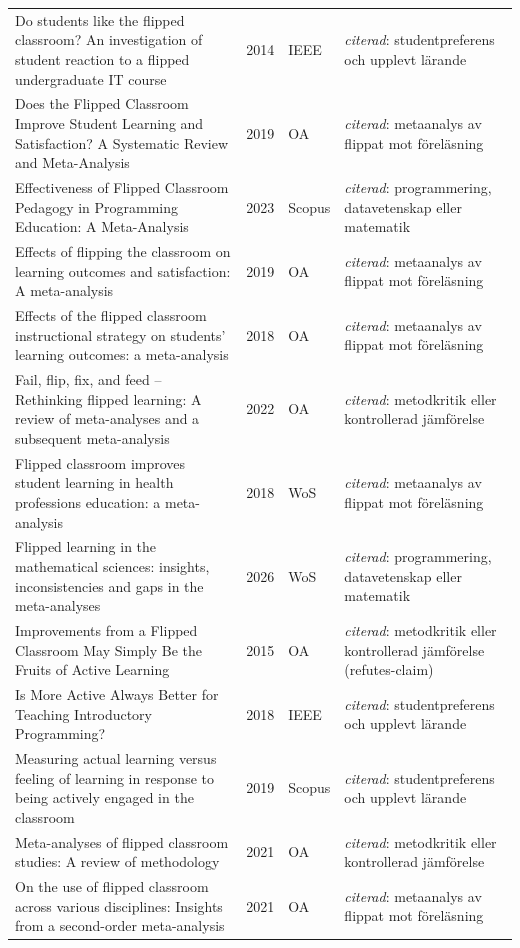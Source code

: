 \begin{longtable}{@{}%
  >{\raggedright\arraybackslash}p{}c%
  >{\raggedright\arraybackslash}p{}%
  >{\raggedright\arraybackslash}p{}@{}}
Do students like the flipped classroom? An investigation of student reaction to a flipped undergraduate IT course & 2014 & IEEE & \emph{citerad}: studentpreferens och upplevt lärande \\
Does the Flipped Classroom Improve Student Learning and Satisfaction? A Systematic Review and Meta-Analysis & 2019 & OA & \emph{citerad}: metaanalys av flippat mot föreläsning \\
Effectiveness of Flipped Classroom Pedagogy in Programming Education: A Meta-Analysis & 2023 & Scopus & \emph{citerad}: programmering, datavetenskap eller matematik \\
Effects of flipping the classroom on learning outcomes and satisfaction: A meta-analysis & 2019 & OA & \emph{citerad}: metaanalys av flippat mot föreläsning \\
Effects of the flipped classroom instructional strategy on students' learning outcomes: a meta-analysis & 2018 & OA & \emph{citerad}: metaanalys av flippat mot föreläsning \\
Fail, flip, fix, and feed -- Rethinking flipped learning: A review of meta-analyses and a subsequent meta-analysis & 2022 & OA & \emph{citerad}: metodkritik eller kontrollerad jämförelse \\
Flipped classroom improves student learning in health professions education: a meta-analysis & 2018 & WoS & \emph{citerad}: metaanalys av flippat mot föreläsning \\
Flipped learning in the mathematical sciences: insights, inconsistencies and gaps in the meta-analyses & 2026 & WoS & \emph{citerad}: programmering, datavetenskap eller matematik \\
Improvements from a Flipped Classroom May Simply Be the Fruits of Active Learning & 2015 & OA & \emph{citerad}: metodkritik eller kontrollerad jämförelse (refutes-claim) \\
Is More Active Always Better for Teaching Introductory Programming? & 2018 & IEEE & \emph{citerad}: studentpreferens och upplevt lärande \\
Measuring actual learning versus feeling of learning in response to being actively engaged in the classroom & 2019 & Scopus & \emph{citerad}: studentpreferens och upplevt lärande \\
Meta-analyses of flipped classroom studies: A review of methodology & 2021 & OA & \emph{citerad}: metodkritik eller kontrollerad jämförelse \\
On the use of flipped classroom across various disciplines: Insights from a second-order meta-analysis & 2021 & OA & \emph{citerad}: metaanalys av flippat mot föreläsning \\

\end{longtable}
